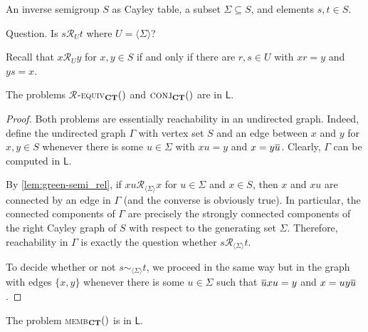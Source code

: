 \documentclass[anonymous,letter,UKenglish,cleveref,autoref,thm-restate]{lipics-v2021}
\makeatletter
\newcommand{\sse}{\subseteq}
\newcommand{\gen}[1]{\langle #1 \rangle}
\newcommand{\LOGSPACE}{\ensuremath{\mathsf{L}}\xspace}
\newcommand*{\gR}[1][]{\mathrel{\mathcal{R}_{#1}}}
\newcommand\nindent{.5pt}
\newcommand\noverline[1]{\kern\nindent\overline{\kern-\nindent#1\kern-\nindent}\kern\nindent}
\newcommand{\ov}[1]{\noverline{#1}}
\theoremstyle{plain}
\theoremstyle{plain}
\providecommand\iitem{}
\providecommand\qitem{}
\newcommand\decproblem@iitem@label{\rlap{Input.}\phantom{Question.}}
\newcommand\decproblem@qitem@label{Question.}
\newenvironment{decproblem}{\begin{description}\begin{samepage}\renewcommand{\iitem}{\item[\decproblem@iitem@label]}\renewcommand{\qitem}{\item[\decproblem@qitem@label]}}{\end{samepage}\end{description}}
\newcommand{\dMemb}[2][]{\textup{\textsc{memb${}_{\mathbf{#1}}\expandafter\ifx\expandafter\relax\detokenize{#2}\relax\else(#2)\fi$}}}
\newcommand{\dConj}[2][]{\textup{\textsc{conj${}_{\mathbf{#1}}\expandafter\ifx\expandafter\relax\detokenize{#2}\relax\else(#2)\fi$}}}
\newcommand{\dRequiv}[2][]{\textup{\textsc{\ensuremath{\gR}-equiv${}_{\mathbf{#1}}\expandafter\ifx\expandafter\relax\detokenize{#2}\relax\else(#2)\fi$}}}
\makeatother
\begin{document}
\begin{decproblem}
	\iitem An inverse semigroup $S$ as Cayley table, a subset $\Sigma \sse S$, and elements $s, t \in S$.
	\qitem Is $s \gR[U] t$ where $U = \gen{\Sigma}$?
\end{decproblem}

	Recall that $x \gR[U] y$ for $x,y \in S$ if and only if there are $r,s \in  U $ with $xr=y$ and $ys = x$.

\begin{proposition}\label{lem:conj_reachability}
	The problems \dRequiv[CT]{} and $\dConj[CT]{}$ are in \LOGSPACE.
\end{proposition}

\begin{proof}
	Both problems are essentially reachability in an undirected graph.
	Indeed, define the undirected graph $\Gamma$ with vertex set $S$ and an edge between $x$ and $y$ for $x,y \in S$ whenever there is some $u \in \Sigma$ with $xu = y$ and $x = y \ov u$. Clearly, $\Gamma$ can be computed in \LOGSPACE.
	
	
	By \cref{lem:green-semi_rel}, if $xu \gR[\gen{\Sigma}] x$ for $u \in \Sigma$ and $x \in S$, then $x$ and $xu$ are connected by an edge in $\Gamma$ (and the converse is obviously true). In particular, the connected components of $\Gamma$ are precisely the strongly connected components of the right Cayley graph of $S$ with respect to the generating set $\Sigma$.
	Therefore, reachability in $\Gamma$ is exactly the question whether  $s \gR[\gen{\Sigma}] t$.
	
	To decide whether or not $s \sim_{\gen{\Sigma}} t$, we proceed in the same way but in the graph with edges $\{x,y\}$ whenever  there is some $u \in \Sigma$ such that $\ov u xu = y$ and $ x = uy\ov u$.
\end{proof}



\begin{proposition}\label{thm:InvSGSL}
	The problem \dMemb[CT]{} is in \LOGSPACE.
\end{proposition}
\end{document}
